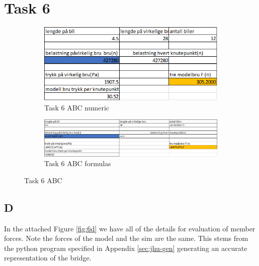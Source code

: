 \documentclass{report}
\begin{document}
\section{Task 6}

\label{sec:f-calc}


\begin{figure}[H]
	\centering
	\begin{subfigure}{.8\linewidth}
		\centering
		\includegraphics [width=.8\linewidth]{task-6-abc}

		\caption{Task 6 ABC numeric}
		\label{fig:6abc:num}
	\end{subfigure}
	\begin{subfigure}{.8\linewidth}
		\centering
		\includegraphics [width=.8\linewidth]{task-6-abc-formulas}

		\caption{Task 6 ABC formulas}
		\label{fig:6abc:form}
	\end{subfigure}
	\caption{Task 6 ABC}
	\label{fig:6abc}
\end{figure}

\subsection{D}

In the attached Figure \ref{fig:6d} we have all of the details for evaluation of member forces. Note the forces of the model and the sim are the same. This stems from the python program specified in Appendix \ref{sec:jhu-gen} generating an accurate representation of the bridge.
\end{document}
